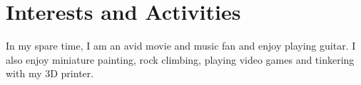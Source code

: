 \section{Interests and Activities}\label{sec:interests-and-activities}
In my spare time, I am an avid movie and music fan and enjoy playing guitar.
I also enjoy miniature painting, rock climbing, playing video games and tinkering with my 3D printer.